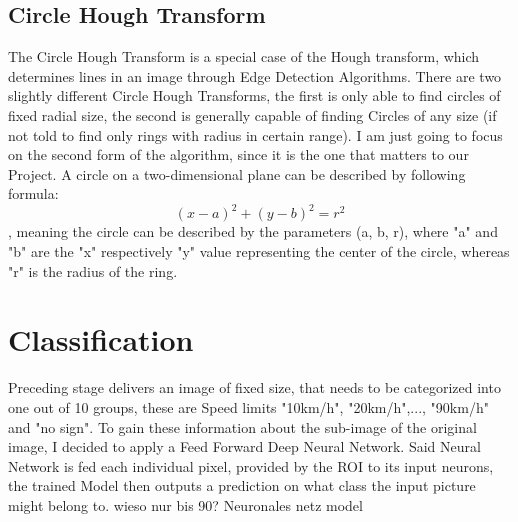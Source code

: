 \subsection{Circle Hough Transform}
The Circle Hough Transform is a special case of the Hough transform, which determines lines in an image through Edge Detection Algorithms. There are two slightly different Circle Hough Transforms, the first is only able to find circles of fixed radial size, the second is generally capable of finding Circles of any size (if not told to find only rings with radius in certain range). I am just going to focus on the second form of the algorithm, since it is the one that matters to our Project. \newline
A circle on a two-dimensional plane can be described by following formula: \[ (x - a)^2 + (y - b)^2 = r^2  \]
, meaning the circle can be described by the parameters (a, b, r), where "a" and "b" are the "x" respectively "y" value representing the center of the circle, whereas "r" is the radius of the ring. 
 

\section{Classification}
Preceding stage delivers an image of fixed size, that needs to be categorized into one out of 10 groups, these are Speed limits "10km/h", "20km/h",..., "90km/h" and "no sign". To gain these information about the sub-image of the original image, I decided to apply a Feed Forward Deep Neural Network. Said Neural Network is fed each individual pixel, provided by the ROI to its input neurons, the trained Model then outputs a prediction on what class the input picture might belong to. 
\newline
wieso nur bis 90? 
\newline
Neuronales netz model